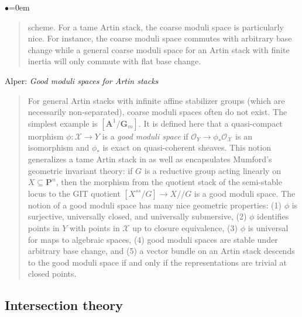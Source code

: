 \begin{list}{$\bullet$}{\leftmargin=0em}
\begin{quote}
scheme. For a tame Artin stack, the coarse moduli space is particularly nice. 
For instance, the coarse moduli space commutes with arbitrary base change while 
a general coarse moduli space for an Artin stack with finite inertia will only 
commute with flat base change.
\end{quote}
\smallskip
\item Alper: \emph{Good moduli spaces for Artin stacks} \cite{alper_good}
\begin{quote}
For general Artin stacks with infinite affine stabilizer groups (which are 
necessarily non-separated), coarse moduli spaces often do not exist. The 
simplest example is $[\mathbf{A}^1 / \mathbf{G}_m]$. It is defined here that a 
quasi-compact 
morphism $\phi: \mathcal{X} \to Y$ is a \emph{good moduli space} if 
$\mathcal{O}_Y \to \phi_* 
\mathcal{O}_{\mathcal{X}}$ is an isomorphism and $\phi_*$ is exact on 
quasi-coherent sheaves. 
This notion generalizes a tame Artin stack in \cite{tame} as well as 
encapsulates Mumford's geometric invariant theory: if $G$ is a reductive group 
acting linearly on $X \subseteq \mathbf{P}^n$, then the morphism from the 
quotient 
stack of the semi-stable locus to the GIT quotient $[X^{ss}/G] \to X//G$ is a 
good moduli space. The notion of a good moduli space has many nice geometric 
properties: (1) $\phi$ is surjective, universally closed, and universally 
submersive, (2) $\phi$ identifies points in $Y$ with points in $\mathcal{X}$ up 
to 
closure equivalence, (3) $\phi$ is universal for maps to algebraic spaces, (4) 
good moduli spaces are stable under arbitrary base change, and (5) a vector 
bundle on an Artin stack descends to the good moduli space if and only if the 
representations are trivial at closed points.
\end{quote}
\end{list}


\subsection{Intersection theory}
\label{subsection-intersection-theory}

